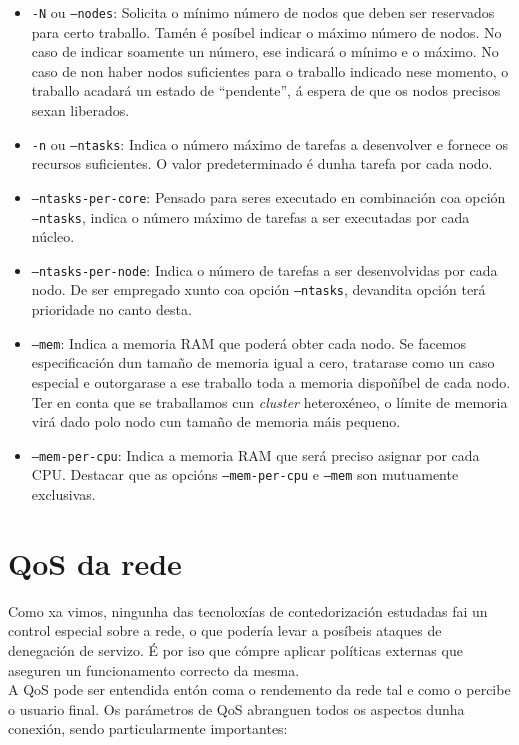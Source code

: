 \begin{itemize}
    \item {\tt -N} ou {\tt --nodes}: Solicita o mínimo número de nodos que deben ser reservados para certo traballo. Tamén é posíbel indicar o máximo número de nodos. No caso de indicar soamente un número, ese indicará o mínimo e o máximo. No caso de non haber nodos suficientes para o traballo indicado nese momento, o traballo acadará un estado de ``pendente'', á espera de que os nodos precisos sexan liberados.
    \item {\tt -n} ou {\tt --ntasks}: Indica o número máximo de tarefas a desenvolver e fornece os recursos suficientes. O valor predeterminado é dunha tarefa por cada nodo.
    \item {\tt --ntasks-per-core}: Pensado para seres executado en combinación coa opción {\tt --ntasks}, indica o número máximo de tarefas a ser executadas por cada núcleo.
    \item {\tt --ntasks-per-node}: Indica o número de tarefas a ser desenvolvidas por cada nodo. De ser empregado xunto coa opción {\tt --ntasks}, devandita opción terá prioridade no canto desta.
    \item {\tt --mem}: Indica a memoria RAM que poderá obter cada nodo. Se facemos especificación dun tamaño de memoria igual a cero, tratarase como un caso especial e outorgarase a ese traballo toda a memoria dispoñíbel de cada nodo. Ter en conta que se traballamos cun \textit{cluster} heteroxéneo, o límite de memoria virá dado polo nodo cun tamaño de memoria máis pequeno.
    \item {\tt --mem-per-cpu}: Indica a memoria RAM que será preciso asignar por cada CPU. Destacar que as opcións {\tt --mem-per-cpu} e {\tt --mem} son mutuamente exclusivas.
\end{itemize}

\section{QoS da rede}
\label{QoSRede}

Como xa vimos, ningunha das tecnoloxías de contedorización estudadas fai un control especial sobre a rede, o que podería levar a posíbeis ataques de denegación de servizo. É por iso que cómpre aplicar políticas externas que aseguren un funcionamento correcto da mesma.\\

A QoS pode ser entendida entón coma o rendemento da rede tal e como o percibe o usuario final. Os parámetros de QoS abranguen todos os aspectos dunha conexión, sendo particularmente importantes:

